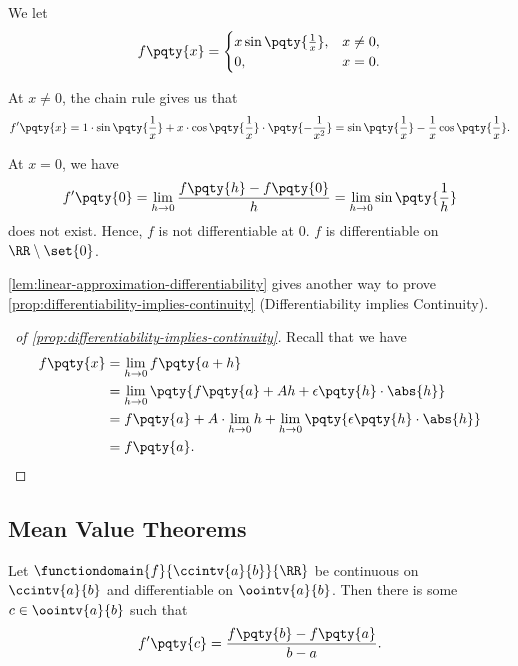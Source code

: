 \begin{example}
    \label{ex:application-chain-rule}%
    We let
    \[
        f\pqty{x} = \begin{cases}
            x \sin \pqty{\frac{1}{x}}, & x \neq 0, \\
            0, & x = 0.
        \end{cases}
    \]

    At \(x \neq 0\), the chain rule gives us that
    \[
        f'\pqty{x} = 1 \cdot \sin \pqty{\frac{1}{x}} + x \cdot \cos \pqty{\frac{1}{x}} \cdot \pqty{- \frac{1}{x^2}} = \sin \pqty{\frac{1}{x}} - \frac{1}{x} \cos \pqty{\frac{1}{x}}.
    \]

    At \(x = 0\), we have
    \[
        f'\pqty{0} = \lim_{h \to 0} \frac{f\pqty{h} - f\pqty{0}}{h} = \lim_{h \to 0} \sin \pqty{\frac{1}{h}}
    \]
    does not exist. Hence, \(f\) is not differentiable at \(0\). \(f\) is differentiable on \(\RR \setminus \set{0}\).
\end{example}

\autoref{lem:linear-approximation-differentiability} gives another way to prove \autoref{prop:differentiability-implies-continuity} (Differentiability implies Continuity).

\begin{proof}[\proofname\ of \autoref{prop:differentiability-implies-continuity}]
    Recall that we have
    \begin{align*}
        f\pqty{x} &= \lim_{h \to 0} f\pqty{a + h} \\
        &= \lim_{h \to 0} \pqty{f\pqty{a} + Ah + \epsilon\pqty{h} \cdot \abs{h}} \\
        &= f\pqty{a} + A \cdot \lim_{h \to 0} h + \lim_{h \to 0} \pqty{\epsilon\pqty{h} \cdot \abs{h}} \\
        &= f\pqty{a}.
    \end{align*}
\end{proof}

\subsection{Mean Value Theorems}

\begin{theorem}
    \label{thm:mean-value-thm}%
    Let \(\functiondomain{f}{\ccintv{a}{b}}{\RR}\) be continuous on \(\ccintv{a}{b}\) and differentiable on \(\oointv{a}{b}\). Then there is some \(c \in \oointv{a}{b}\) such that
    \[
        f'\pqty{c} = \frac{f\pqty{b} - f\pqty{a}}{b - a}.
    \]
\end{theorem}

